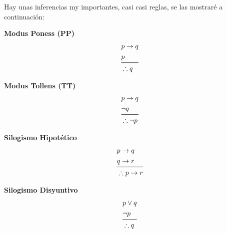 \documentclass[12pt, fleqn]{report}                             %
\begin{document}
            Hay unas inferencias my importantes, casi casi reglas, se las mostraré a continuación:\\

            \begin{multicols}{2}
                
                \large{\textbf{Modus Poness (PP)}}
                    \begin{equation*}
                    \begin{split}
                        &p \to q        \\
                        &p              \\
                        \midrule
                        &\therefore q
                    \end{split}
                    \end{equation*}

                \large{\textbf{Modus Tollens (TT)}}
                    \begin{equation*}
                    \begin{split}
                        &p \to q        \\
                        &\lnot q        \\
                        \midrule
                        &\therefore \lnot p
                    \end{split}
                    \end{equation*}

            \end{multicols}

            \bigskip

            \begin{multicols}{2}
                
                \large{\textbf{Silogismo Hipotético}}
                    \begin{equation*}
                    \begin{split}
                        &p \to q        \\
                        &q \to r        \\
                        \midrule
                        &\therefore p \to r
                    \end{split}
                    \end{equation*}

                \large{\textbf{Silogismo Disyuntivo}}
                    \begin{equation*}
                    \begin{split}
                        &p \lor q       \\
                        &\lnot p        \\
                        \midrule
                        &\therefore q
                    \end{split}
                    \end{equation*}

            \end{multicols}
\end{document}
